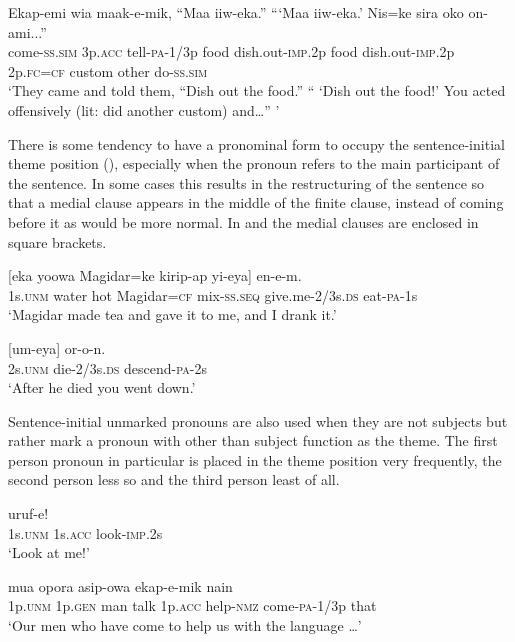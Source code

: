 \ea%
\label{ex:3:x1779}
\gll Ekap-emi wia maak-e-mik, ``Maa iiw-eka.'' ```Maa iiw-eka.' Nis=ke sira oko on-ami...''\\
come-\textsc{ss}.\textsc{sim} 3p.\textsc{acc} tell-\textsc{pa}-1/3p food dish.out-\textsc{imp}.2p food dish.out-\textsc{imp}.2p 2p.\textsc{fc}=\textsc{cf} custom other do-\textsc{ss}.\textsc{sim}\\
\glt`They came and told them, ``Dish out the food.'' `` `Dish out the food!' You acted offensively (lit: did another custom) and{\dots}'' '
\z

There is some tendency to have a pronominal form to occupy the sentence-initial theme position (), especially when the pronoun refers to the main participant of the sentence. In some cases this results in the restructuring of the sentence so that a medial clause appears in the middle of the finite clause, instead of coming before it as would be more normal. In  and  the medial clauses are enclosed in square brackets. 

\ea%
\label{ex:3:x539}
\gll {} [eka yoowa Magidar=ke kirip-ap yi-eya] en-e-m.\\
1s.\textsc{unm} water hot Magidar=\textsc{cf} mix-\textsc{ss}.\textsc{seq} give.me-2/3s.\textsc{ds} eat-\textsc{pa}-1s\\
\glt`Magidar made tea and gave it to me, and I drank it.'
\z

\ea%
\label{ex:3:x540}
\gll {} [um-eya] or-o-n. \\
2s.\textsc{unm} die-2/3s.\textsc{ds} descend-\textsc{pa}-2s\\
\glt`After he died you went down.'
\z

Sentence-initial unmarked pronouns are also used when they are not subjects but rather mark a pronoun with other than subject function as the theme. The first person pronoun in particular is placed in the theme position very frequently, the second person less so and the third person least of all.

\ea%
\label{ex:3:x535}
\gll {}  uruf-e! \\
1s.\textsc{unm} 1s.\textsc{acc} look-\textsc{imp}.2s\\
\glt`Look at me!'
\z

\ea%
\label{ex:3:x536}
\gll {}  mua opora  asip-owa ekap-e-mik nain \\
1p.\textsc{unm} 1p.\textsc{gen} man talk 1p.\textsc{acc} help-\textsc{nmz} come-\textsc{pa}-1/3p that\\
\glt`Our men who have come to help us with the language {\dots}'
\z

